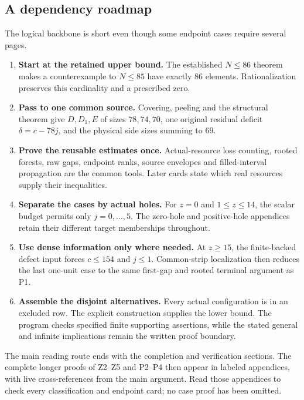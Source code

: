 \documentclass[11pt,letterpaper]{article}
\newcommand{\FS}{\operatorname{FS}}
\newcommand{\Z}{\mathbb Z}\newcommand{\R}{\mathbb R}
\newcommand{\card}[1]{\lvert#1\rvert}
\newcommand{\iv}[2]{[#1,#2]_{\Z}}
\theoremstyle{definition}\newtheorem{definition}[theorem]{Definition}
\begin{document}
\subsection{A dependency roadmap}
The logical backbone is short even though some endpoint cases require several pages.
\begin{enumerate}
\item \textbf{Start at the retained upper bound.} The established $N\le86$ theorem makes a counterexample to $N\le85$ have exactly $86$ elements. Rationalization preserves this cardinality and a prescribed zero.
\item \textbf{Pass to one common source.} Covering, peeling and the structural theorem give $D,D_1,E$ of sizes $78,74,70$, one original residual deficit $\delta=c-78j$, and the physical side sizes summing to $69$.
\item \textbf{Prove the reusable estimates once.} Actual-resource loss counting, rooted forests, raw gaps, endpoint ranks, source envelopes and filled-interval propagation are the common tools. Later cards state which real resources supply their inequalities.
\item \textbf{Separate the cases by actual holes.} For $z=0$ and $1\le z\le14$, the scalar budget permits only $j=0,\ldots,5$. The zero-hole and positive-hole appendices retain their different target memberships throughout.
\item \textbf{Use dense information only where needed.} At $z\ge15$, the finite-backed defect input forces $c\le154$ and $j\le1$. Common-strip localization then reduces the last one-unit case to the same first-gap and rooted terminal argument as P1.
\item \textbf{Assemble the disjoint alternatives.} Every actual configuration is in an excluded row. The explicit construction supplies the lower bound. The program checks specified finite supporting assertions, while the stated general and infinite implications remain the written proof boundary.
\end{enumerate}
The main reading route ends with the completion and verification sections. The complete longer proofs of Z2--Z5 and P2--P4 then appear in labeled appendices, with live cross-references from the main argument. Read those appendices to check every classification and endpoint card; no case proof has been omitted.


\end{document}
